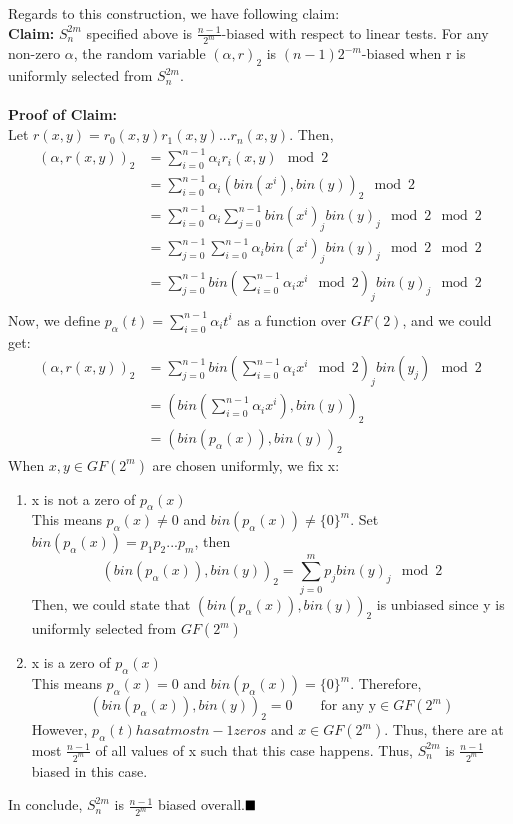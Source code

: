 \documentclass[a4paper, english]{paper}
\begin{document}
Regards to this construction, we have following claim:\\
\noindent\textbf{Claim:} $S^{2m}_n$ specified above is $\frac{n-1}{2^m}$-biased with respect to linear tests. For any non-zero $\alpha$, the random variable $(\alpha,r)_2$ is $(n-1)2^{-m}$-biased when r is uniformly selected from $S^{2m}_n$.\\\\
\noindent\textbf{Proof of Claim:}\\
Let $r(x,y)=r_0(x,y)r_1(x,y)...r_n(x,y)$. Then, 
\begin{align*}
(\alpha,r(x,y))_2 &= \sum_{i=0}^{n-1}\alpha_ir_i(x,y) \mod 2\\
&= \sum_{i=0}^{n-1}\alpha_i(bin(x^i),bin(y))_2 \mod 2\\
&= \sum_{i=0}^{n-1}\alpha_i \sum_{j=0}^{n-1}bin(x^i)_jbin(y)_j \mod2 \mod 2\\
&= \sum_{j=0}^{n-1}\sum_{i=0}^{n-1}\alpha_i bin(x^i)_jbin(y)_j \mod2 \mod 2\\
&= \sum_{j=0}^{n-1}bin\left(\sum_{i=0}^{n-1}\alpha_i x^i \mod2 \right)_jbin(y)_j \mod 2\\
\end{align*}
Now, we define $p_\alpha(t) = \sum_{i=0}^{n-1}\alpha_i t^i$ as a function over $GF(2)$, and we could get:
\begin{align*}
(\alpha,r(x,y))_2 
&= \sum_{j=0}^{n-1}bin\left(\sum_{i=0}^{n-1}\alpha_i x^i \mod2 \right)_jbin(y_j) \mod 2\\
&= (bin(\sum_{i=0}^{n-1}\alpha_i x^i),bin(y))_2\\
&= (bin(p_\alpha(x)), bin(y))_2
\end{align*}
When $x,y\in GF(2^m)$ are chosen uniformly, we fix x:
\begin{enumerate}
\item x is not a zero of $p_\alpha(x)$\\
This means $p_\alpha(x)\ne 0$ and $bin(p_\alpha(x))\ne\{0\}^m$. Set $bin(p_\alpha(x))=p_1p_2...p_{m}$, then 
$$(bin(p_\alpha(x)), bin(y))_2 = \sum_{j=0}^m p_jbin(y)_j \mod 2$$
Then, we could state that $(bin(p_\alpha(x)), bin(y))_2$ is unbiased since y is uniformly selected from $GF(2^m)$
\item x is a zero of $p_\alpha(x)$\\
This means $p_\alpha(x)= 0$ and $bin(p_\alpha(x))=\{0\}^m$. Therefore,$$(bin(p_\alpha(x)), bin(y))_2 = 0 \qquad\text{for any y}\in GF(2^m)$$
However, $p_\alpha(t)has at most n-1 zeros$ and $x\in GF(2^m)$. Thus, there are at most $\frac{n-1}{2^m}$ of all values of x such that this case happens. Thus, $S^{2m}_n$ is $\frac{n-1}{2^m}$ biased in this case.
\end{enumerate}
In conclude, $S^{2m}_n$ is $\frac{n-1}{2^m}$ biased overall.$\hfill\blacksquare$ \\
\end{document}
